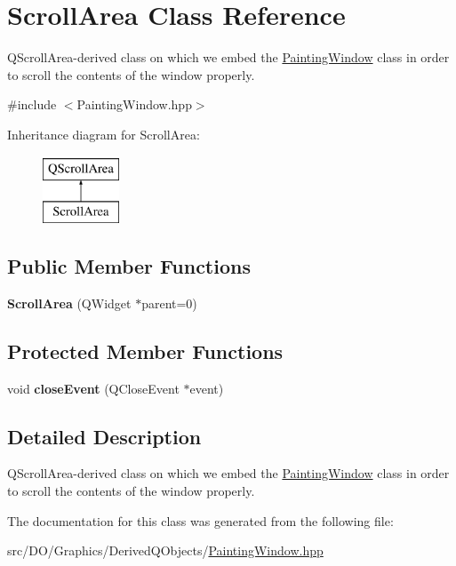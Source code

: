 \hypertarget{class_d_o_1_1_scroll_area}{\section{Scroll\-Area Class Reference}
\label{class_d_o_1_1_scroll_area}
}


Q\-Scroll\-Area-\/derived class on which we embed the \hyperlink{class_d_o_1_1_painting_window}{Painting\-Window} class in order to scroll the contents of the window properly.  




{\ttfamily \#include $<$Painting\-Window.\-hpp$>$}

Inheritance diagram for Scroll\-Area\-:\begin{figure}[H]
\begin{center}
\leavevmode
\includegraphics[height=2.000000cm]{class_d_o_1_1_scroll_area}
\end{center}
\end{figure}
\subsection*{Public Member Functions}
\begin{DoxyCompactItemize}
\item 
\hypertarget{class_d_o_1_1_scroll_area_a8a2de1733d4acfc45cd0bd449b882279}{{\bfseries Scroll\-Area} (Q\-Widget $\ast$parent=0)}\label{class_d_o_1_1_scroll_area_a8a2de1733d4acfc45cd0bd449b882279}

\end{DoxyCompactItemize}
\subsection*{Protected Member Functions}
\begin{DoxyCompactItemize}
\item 
\hypertarget{class_d_o_1_1_scroll_area_a5de2bd09256045c0b96e5a0be780fa85}{void {\bfseries close\-Event} (Q\-Close\-Event $\ast$event)}\label{class_d_o_1_1_scroll_area_a5de2bd09256045c0b96e5a0be780fa85}

\end{DoxyCompactItemize}


\subsection{Detailed Description}
Q\-Scroll\-Area-\/derived class on which we embed the \hyperlink{class_d_o_1_1_painting_window}{Painting\-Window} class in order to scroll the contents of the window properly. 

The documentation for this class was generated from the following file\-:\begin{DoxyCompactItemize}
\item 
src/\-D\-O/\-Graphics/\-Derived\-Q\-Objects/\hyperlink{_painting_window_8hpp}{Painting\-Window.\-hpp}\end{DoxyCompactItemize}
